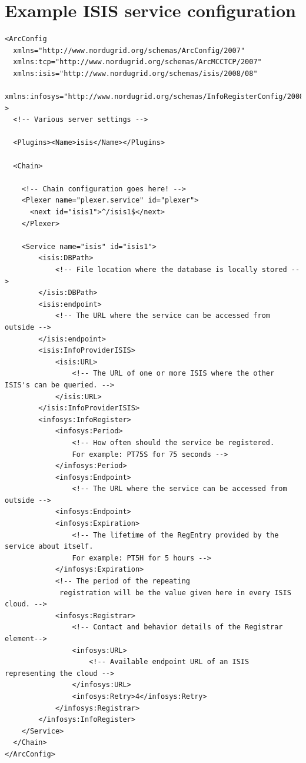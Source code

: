 \documentclass{book}
\begin{document}
\section{Example ISIS service configuration}
\label{annex:example_isis_configuration}
\begin{verbatim}
<ArcConfig
  xmlns="http://www.nordugrid.org/schemas/ArcConfig/2007"
  xmlns:tcp="http://www.nordugrid.org/schemas/ArcMCCTCP/2007"
  xmlns:isis="http://www.nordugrid.org/schemas/isis/2008/08"
  xmlns:infosys="http://www.nordugrid.org/schemas/InfoRegisterConfig/2008"
>
  <!-- Various server settings -->

  <Plugins><Name>isis</Name></Plugins>

  <Chain>

    <!-- Chain configuration goes here! -->
    <Plexer name="plexer.service" id="plexer">
      <next id="isis1">^/isis1$</next>
    </Plexer>

    <Service name="isis" id="isis1">
        <isis:DBPath>
            <!-- File location where the database is locally stored -->
        </isis:DBPath>
        <isis:endpoint>
            <!-- The URL where the service can be accessed from outside -->
        </isis:endpoint>
        <isis:InfoProviderISIS>
            <isis:URL>
                <!-- The URL of one or more ISIS where the other ISIS's can be queried. -->
            </isis:URL>
        </isis:InfoProviderISIS>
        <infosys:InfoRegister>
            <infosys:Period>
                <!-- How often should the service be registered. 
                For example: PT75S for 75 seconds -->
            </infosys:Period>
            <infosys:Endpoint>
                <!-- The URL where the service can be accessed from outside -->
            <infosys:Endpoint>
            <infosys:Expiration>
                <!-- The lifetime of the RegEntry provided by the service about itself.
                For example: PT5H for 5 hours -->
            </infosys:Expiration>
            <!-- The period of the repeating 
             registration will be the value given here in every ISIS cloud. -->
            <infosys:Registrar>
                <!-- Contact and behavior details of the Registrar element-->
                <infosys:URL>
                    <!-- Available endpoint URL of an ISIS representing the cloud -->
                </infosys:URL>
                <infosys:Retry>4</infosys:Retry>        
            </infosys:Registrar>
        </infosys:InfoRegister>
    </Service>
  </Chain>
</ArcConfig>

\end{verbatim}




\end{document}
